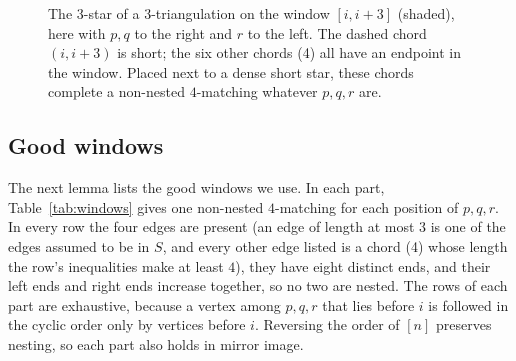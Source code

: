 \documentclass[11pt]{amsart}
\theoremstyle{definition}\newtheorem{problem}{Problem}
\theoremstyle{remark}\newtheorem*{remark}{Remark}
\begin{document}
\begin{figure}[ht]
\centering
{}
\caption{The $3$-star of a $3$-triangulation on the window $[i,i+3]$ (shaded), here with $p,q$ to the right and $r$ to
the left. The dashed chord $(i,i+3)$ is short; the six other chords (4) all have an endpoint in the window. Placed next
to a dense short star, these chords complete a non-nested $4$-matching whatever $p,q,r$ are.}
\label{fig:star}
\end{figure}

\subsection{Good windows}
The next lemma lists the good windows we use. In each part, Table~\ref{tab:windows} gives one non-nested $4$-matching
for each position of $p,q,r$. In every row the four edges are present (an edge of length at most $3$ is one of the
edges assumed to be in $S$, and every other edge listed is a chord (4) whose length the row's inequalities make at least
$4$), they have eight distinct ends, and their left ends and right ends increase together, so no two are nested. The
rows of each part are exhaustive, because a vertex among $p,q,r$ that lies before $i$ is followed in the cyclic order
only by vertices before $i$. Reversing the order of $[n]$ preserves nesting, so each part also holds in mirror image.
\end{document}
